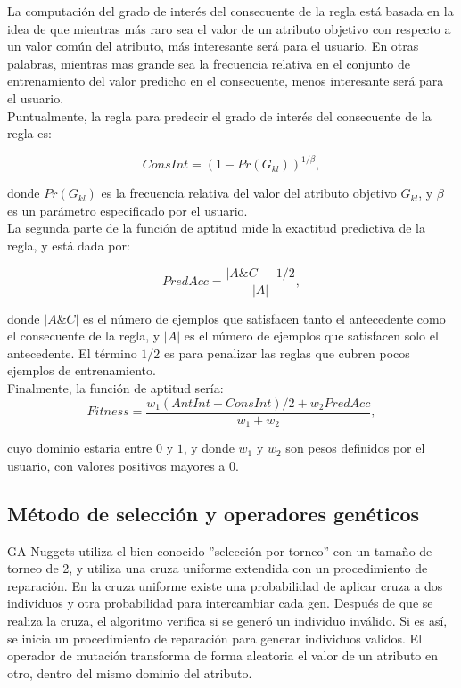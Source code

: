 La computación del grado de interés del consecuente de la regla está basada en la idea de que mientras más raro sea el valor de un atributo objetivo con respecto a un valor común del atributo, más interesante será para el usuario. En otras palabras, mientras mas grande sea la frecuencia relativa en el conjunto de entrenamiento del valor predicho en el consecuente, menos interesante será para el usuario.
\\

Puntualmente, la regla para predecir el grado de interés del consecuente de la regla es:

\begin{equation} \label{eq:5}
ConsInt= (1-Pr(G_{kl}))^{1/\beta},
\end{equation}

\noindent
donde $Pr(G_{kl})$ es la frecuencia relativa del valor del atributo objetivo $G_{kl}$, y $\beta$ es un parámetro especificado por el usuario.
\\

La segunda parte de la función de aptitud mide la exactitud predictiva de la regla, y está dada por:

\begin{equation} \label{eq:6}
PredAcc= \frac{|A\&C|-1/2}{|A|},
\end{equation}

\noindent
donde $|A\&C|$ es el número de ejemplos que satisfacen tanto el antecedente como el consecuente de la regla, y $|A|$ es el número de ejemplos que satisfacen solo el antecedente. El término $1/2$ es para penalizar las reglas que cubren pocos ejemplos de entrenamiento.
\\

Finalmente, la función de aptitud sería:
\begin{equation} \label{eq:7}
Fitness= \frac{w_1(AntInt+ConsInt)/2+w_2PredAcc}{w_1+w_2},
\end{equation}

\noindent
cuyo dominio estaria entre $0$ y $1$, y donde $w_1$ y $w_2$ son pesos definidos por el usuario, con valores positivos mayores a $0$.

\subsection{Método de selección y operadores genéticos}

GA-Nuggets utiliza el bien conocido ''selección por torneo'' con un tamaño de torneo de 2, y utiliza una cruza uniforme extendida con un procedimiento de reparación. En la cruza uniforme existe una probabilidad de aplicar cruza a dos individuos y otra probabilidad para intercambiar cada gen. Después de que se realiza la cruza, el algoritmo verifica si se generó un individuo inválido. Si es así, se inicia un procedimiento de reparación para generar individuos validos. El operador de mutación transforma de forma aleatoria el valor de un atributo en otro, dentro del mismo dominio del atributo.
\\

